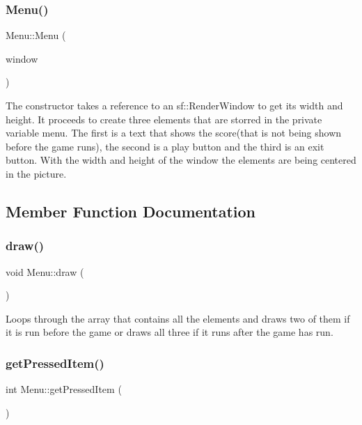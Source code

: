 \subsubsection{\texorpdfstring{Menu()}{Menu()}}
{\footnotesize\ttfamily Menu\+::\+Menu (\begin{DoxyParamCaption}\item[{sf\+::\+Render\+Window \&}]{window }\end{DoxyParamCaption})}

The constructor takes a reference to an sf\+::\+Render\+Window to get it\textquotesingle{}s width and height. It proceeds to create three elements that are storred in the private variable menu. The first is a text that shows the score(that is not being shown before the game runs), the second is a play button and the third is an exit button. With the width and height of the window the elements are being centered in the picture. 

\subsection{Member Function Documentation}
\mbox{\label{classMenu_a2cd7ab9901a8f42a3ae977d0774398a6}} 
\subsubsection{\texorpdfstring{draw()}{draw()}}
{\footnotesize\ttfamily void Menu\+::draw (\begin{DoxyParamCaption}{ }\end{DoxyParamCaption})}

Loops through the array that contains all the elements and draws two of them if it is run before the game or draws all three if it runs after the game has run. \mbox{\label{classMenu_a6cb35aed2a232dcc0859c3b4e419454c}} 
\subsubsection{\texorpdfstring{get\+Pressed\+Item()}{getPressedItem()}}
{\footnotesize\ttfamily int Menu\+::get\+Pressed\+Item (\begin{DoxyParamCaption}{ }\end{DoxyParamCaption})}

